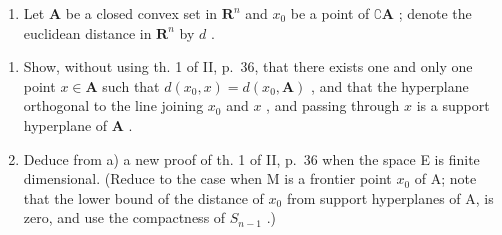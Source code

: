 \begin{enumerate}
\def\labelenumi{\arabic{enumi})}
\setcounter{enumi}{4}
\tightlist
\item
  Let \(\mathbf{A}\) be a closed convex set in \(\mathbf{R}^n\) and \(x_0\) be a point of \(\complement \mathbf{A}\) ; denote the euclidean distance in \(\mathbf{R}^n\) by \(d\) .
\end{enumerate}

\begin{enumerate}
\def\labelenumi{\alph{enumi})}
\item
  Show, without using th. 1 of II, p.~36, that there exists one and only one point \(x \in \mathbf{A}\) such that \(d(x_0, x) = d(x_0, \mathbf{A})\) , and that the hyperplane orthogonal to the line joining \(x_0\) and \(x\) , and passing through \(x\) is a support hyperplane of \(\mathbf{A}\) .
\item
  Deduce from a) a new proof of th. 1 of II, p.~36 when the space E is finite dimensional. (Reduce to the case when M is a frontier point \(x_{0}\) of A; note that the lower bound of the distance of \(x_{0}\) from support hyperplanes of A, is zero, and use the compactness of \(S_{n-1}\) .)
\end{enumerate}

